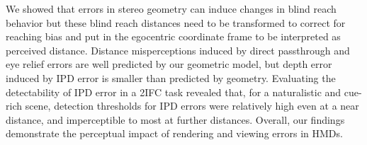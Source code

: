 We showed that errors in stereo geometry can induce changes in blind reach behavior but these blind reach distances need to be transformed to correct for reaching bias and put in the egocentric coordinate frame to be interpreted as perceived distance. Distance misperceptions induced by direct passthrough and eye relief errors are well predicted by our geometric model, but depth error induced by IPD error is smaller than predicted by geometry. Evaluating the detectability of IPD error in a 2IFC task revealed that, for a naturalistic and cue-rich scene, detection thresholds for IPD errors were relatively high even at a near distance, and imperceptible to most at further distances. Overall, our findings demonstrate the perceptual impact of rendering and viewing errors in HMDs.
